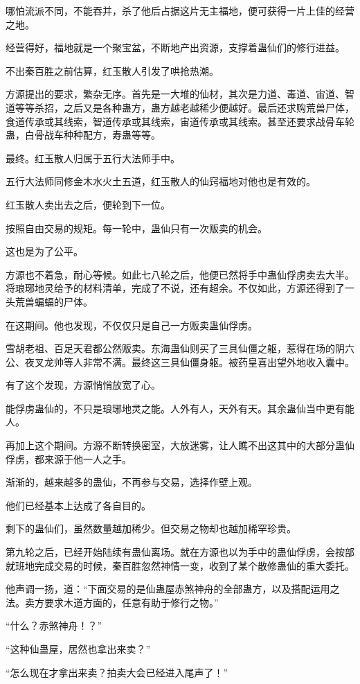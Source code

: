 \begin{this_body}
哪怕流派不同，不能吞并，杀了他后占据这片无主福地，便可获得一片上佳的经营之地。

经营得好，福地就是一个聚宝盆，不断地产出资源，支撑着蛊仙们的修行进益。

不出秦百胜之前估算，红玉散人引发了哄抢热潮。

方源提出的要求，繁杂无序。首先是一大堆的仙材，其次是力道、毒道、宙道、智道等等杀招，之后又是各种蛊方，蛊方越老越稀少便越好。最后还求购荒兽尸体，食道传承或其线索，智道传承或其线索，宙道传承或其线索。甚至还要求战骨车轮蛊，白骨战车种种配方，寿蛊等等。

最终。红玉散人归属于五行大法师手中。

五行大法师同修金木水火土五道，红玉散人的仙窍福地对他也是有效的。

红玉散人卖出去之后，便轮到下一位。

按照自由交易的规矩。每一轮中，蛊仙只有一次贩卖的机会。

这也是为了公平。

方源也不着急，耐心等候。如此七八轮之后，他便已然将手中蛊仙俘虏卖去大半。将琅琊地灵给予的材料清单，完成了不说，还有超余。不仅如此，方源还得到了一头荒兽蝙蝠的尸体。

在这期间。他也发现，不仅仅只是自己一方贩卖蛊仙俘虏。

雪胡老祖、百足天君都公然贩卖。东海蛊仙则买了三具仙僵之躯，惹得在场的阴六公、夜叉龙帅等人非常不满。最终这三具仙僵身躯。被药皇喜出望外地收入囊中。

有了这个发现，方源悄悄放宽了心。

能俘虏蛊仙的，不只是琅琊地灵之能。人外有人，天外有天。其余蛊仙当中更有能人。

再加上这个期间。方源不断转换密室，大放迷雾，让人瞧不出这其中的大部分蛊仙俘虏，都来源于他一人之手。

渐渐的，越来越多的蛊仙，不再参与交易，选择作壁上观。

他们已经基本上达成了各自目的。

剩下的蛊仙们，虽然数量越加稀少。但交易之物却也越加稀罕珍贵。

第九轮之后，已经开始陆续有蛊仙离场。就在方源也以为手中的蛊仙俘虏，会按部就班地完成交易的时候，秦百胜忽然神情一变，收到了某个散修蛊仙的重大委托。

他声调一扬，道：“下面交易的是仙蛊屋赤煞神舟的全部蛊方，以及搭配运用之法。卖方要求木道方面的，任意有助于修行之物。”

“什么？赤煞神舟！？”

“这种仙蛊屋，居然也拿出来卖？”

“怎么现在才拿出来卖？拍卖大会已经进入尾声了！”


\end{this_body}
